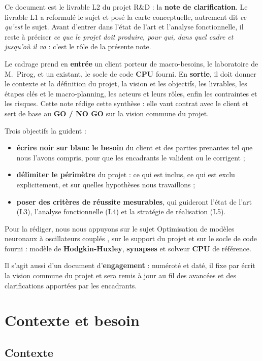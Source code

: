 \documentclass{report}
\begin{document}
Ce document est le livrable L2 du projet R\&D : la \textbf{note de clarification}. Le livrable L1 a reformulé le sujet et posé la carte conceptuelle, autrement dit \emph{ce qu'est} le sujet. Avant d'entrer dans l'état de l'art et l'analyse fonctionnelle, il reste à préciser \emph{ce que le projet doit produire, pour qui, dans quel cadre et jusqu'où il va} : c'est le rôle de la présente note.

Le cadrage prend en \textbf{entrée} un client porteur de macro-besoins, le laboratoire de M.~Pirog, et un existant, le socle de code \textbf{CPU} fourni. En \textbf{sortie}, il doit donner le contexte et la définition du projet, la vision et les objectifs, les livrables, les étapes clés et le macro-planning, les acteurs et leurs rôles, enfin les contraintes et les risques. Cette note rédige cette synthèse : elle vaut \og contrat \fg{} avec le client et sert de base au \textbf{GO / NO GO} sur la vision commune du projet.

Trois objectifs la guident :
\begin{itemize}
    \item \textbf{écrire noir sur blanc le besoin} du client et des parties prenantes tel que nous l'avons compris, pour que les encadrants le valident ou le corrigent ;
    \item \textbf{délimiter le périmètre} du projet : ce qui est inclus, ce qui est exclu explicitement, et sur quelles hypothèses nous travaillons ;
    \item \textbf{poser des critères de réussite mesurables}, qui guideront l'état de l'art (L3), l'analyse fonctionnelle (L4) et la stratégie de réalisation (L5).
\end{itemize}

Pour la rédiger, nous nous appuyons sur le sujet \og Optimisation de modèles neuronaux à oscillateurs couplés \fg{}, sur le support du projet et sur le socle de code fourni : modèle de \textbf{Hodgkin-Huxley}, \textbf{synapses} et solveur \textbf{CPU} de référence.

Il s'agit aussi d'un document d'\textbf{engagement} : numéroté et daté, il fixe par écrit la vision commune du projet et sera remis à jour au fil des avancées et des clarifications apportées par les encadrants.

\chapter{Contexte et besoin}

\section{Contexte}
\end{document}

